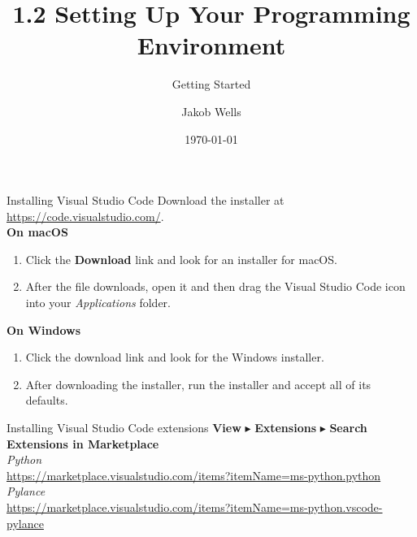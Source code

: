 \documentclass[aspectratio=169]{beamer}
\title{1.2 Setting Up Your Programming Environment}
\subtitle{Getting Started}
\author{Jakob Wells}
\begin{document}
\date{\today}


\begin{frame}
    \titlepage{}
\end{frame}


\begin{frame}[fragile]{Installing Visual Studio Code}
    Download the installer at \href{https://code.visualstudio.com/}{https://code.visualstudio.com/}. \\
    \vspace{10pt}
    \textbf{On macOS} \\
    \begin{enumerate}[label={\arabic*.},itemsep=5pt]
        \item Click the \textbf{Download} link and look for an installer for macOS.
        \item After the file downloads, open it and then drag the Visual Studio Code icon into your \textit{Applications} folder.
    \end{enumerate}
    \vspace{10pt}
    \textbf{On Windows} \\
    \begin{enumerate}[label={\arabic*.},itemsep=5pt]
        \item Click the download link and look for the Windows installer.
        \item After downloading the installer, run the installer and accept all of its defaults.
    \end{enumerate}
\end{frame}


\begin{frame}[fragile]{Installing Visual Studio Code extensions}
    \textbf{View} \(\blacktriangleright\) \textbf{Extensions} \(\blacktriangleright\) \textbf{Search Extensions in Marketplace} \\
    \vspace{15pt}
    \textit{Python} \\
    \href{https://marketplace.visualstudio.com/items?itemName=ms-python.python}{https://marketplace.visualstudio.com/items?itemName=ms-python.python} \\
    \vspace{10pt}
    \textit{Pylance} \\
    \href{https://marketplace.visualstudio.com/items?itemName=ms-python.vscode-pylance}{https://marketplace.visualstudio.com/items?itemName=ms-python.vscode-pylance}
\end{frame}
\end{document}
